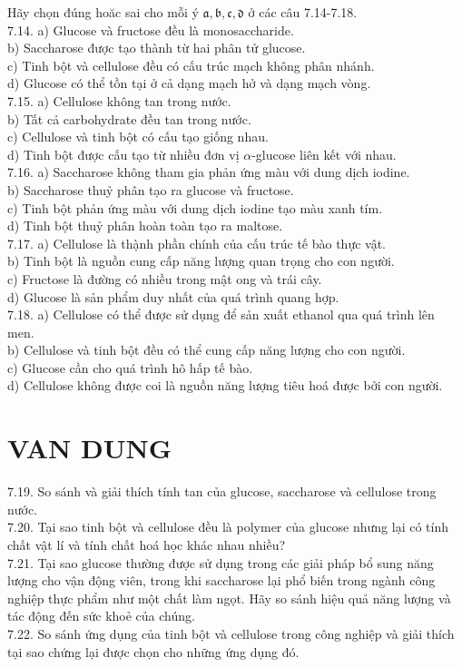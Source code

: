 \documentclass[10pt]{article}
\begin{document}
Hãy chọn đúng hoăc sai cho mỗi ý $\mathfrak{a}, \mathfrak{b}, \mathfrak{c}, \mathfrak{d}$ ở các câu 7.14-7.18.\\
7.14. a) Glucose và fructose đều là monosaccharide.\\
b) Saccharose được tạo thành từ hai phân tử glucose.\\
c) Tinh bột và cellulose đều có cấu trúc mạch không phân nhánh.\\
d) Glucose có thể tồn tại ở cả dạng mạch hở và dạng mạch vòng.\\
7.15. a) Cellulose không tan trong nước.\\
b) Tất cả carbohydrate đều tan trong nước.\\
c) Cellulose và tinh bột có cấu tạo giống nhau.\\
d) Tinh bột được cấu tạo từ nhiều đơn vị $\alpha$-glucose liên kết với nhau.\\
7.16. a) Saccharose không tham gia phản ứng màu với dung dịch iodine.\\
b) Saccharose thuỷ phân tạo ra glucose và fructose.\\
c) Tinh bột phản ứng màu với dung dịch iodine tạo màu xanh tím.\\
d) Tinh bột thuỷ phân hoàn toàn tạo ra maltose.\\
7.17. a) Cellulose là thạ̀nh phần chính của cấu trúc tế bào thực vật.\\
b) Tinh bột là nguồn cung cấp năng lượng quan trọng cho con người.\\
c) Fructose là đường có nhiều trong mật ong và trái cây.\\
d) Glucose là sản phẩm duy nhất của quá trình quang hợp.\\
7.18. a) Cellulose có thể được sử dụng để sản xuất ethanol qua quá trình lên men.\\
b) Cellulose và tinh bột đều có thể cung cấp năng lượng cho con người.\\
c) Glucose cần cho quá trình hô hấp tế bào.\\
d) Cellulose không được coi là nguồn năng lượng tiêu hoá được bởi con người.

\section*{VAN DUNG}
7.19. So sánh và giải thích tính tan của glucose, saccharose và cellulose trong nước.\\
7.20. Tại sao tinh bột và cellulose đều là polymer của glucose nhưng lại có tính chất vật lí và tính chất hoá học khác nhau nhiều?\\
7.21. Tại sao glucose thường được sử dụng trong các giải pháp bổ sung năng lượng cho vận động viên, trong khi saccharose lại phổ biến trong ngành công nghiệp thực phẩm như một chất làm ngọt. Hãy so sánh hiệu quả năng lượng và tác động đến sức khoẻ của chúng.\\
7.22. So sánh ứng dụng của tinh bột và cellulose trong công nghiệp và giải thích tại sao chứng lại được chọn cho những ứng dụng đó.
\end{document}
